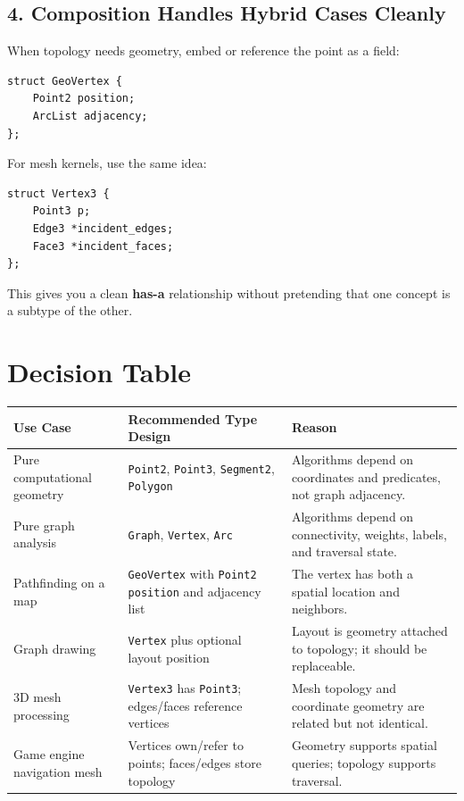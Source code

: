 \documentclass[11pt]{article}
\begin{document}
\subsection{4. Composition Handles Hybrid Cases Cleanly}

When topology needs geometry, embed or reference the point as a field:

\begin{verbatim}
struct GeoVertex {
    Point2 position;
    ArcList adjacency;
};
\end{verbatim}

For mesh kernels, use the same idea:

\begin{verbatim}
struct Vertex3 {
    Point3 p;
    Edge3 *incident_edges;
    Face3 *incident_faces;
};
\end{verbatim}

This gives you a clean \textbf{has-a} relationship without pretending that one concept is a subtype of the other.

\section{Decision Table}

\begin{center}
\begin{tabularx}{\textwidth}{>{\raggedright\arraybackslash}p{} >{\raggedright\arraybackslash}p{} >{\raggedright\arraybackslash}X}
\toprule
\textbf{Use Case} & \textbf{Recommended Type Design} & \textbf{Reason} \\
\midrule
Pure computational geometry & \texttt{Point2}, \texttt{Point3}, \texttt{Segment2}, \texttt{Polygon} & Algorithms depend on coordinates and predicates, not graph adjacency. \\
Pure graph analysis & \texttt{Graph}, \texttt{Vertex}, \texttt{Arc} & Algorithms depend on connectivity, weights, labels, and traversal state. \\
Pathfinding on a map & \texttt{GeoVertex} with \texttt{Point2 position} and adjacency list & The vertex has both a spatial location and neighbors. \\
Graph drawing & \texttt{Vertex} plus optional layout position & Layout is geometry attached to topology; it should be replaceable. \\
3D mesh processing & \texttt{Vertex3} has \texttt{Point3}; edges/faces reference vertices & Mesh topology and coordinate geometry are related but not identical. \\
Game engine navigation mesh & Vertices own/refer to points; faces/edges store topology & Geometry supports spatial queries; topology supports traversal. \\
\bottomrule
\end{tabularx}
\end{center}
\end{document}
